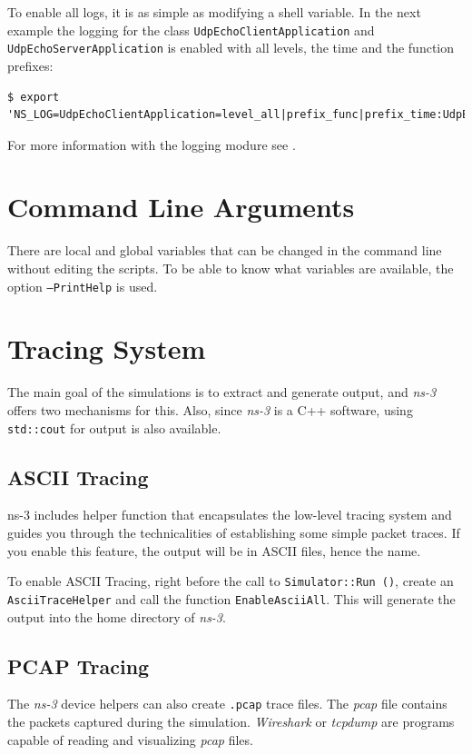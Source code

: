 To enable all logs, it is as simple as modifying a shell variable. In the next example the logging for the class
\texttt{UdpEchoClientApplication} and \texttt{UdpEchoServerApplication} is enabled with all levels, the time 
and the function prefixes:

\begin{lstlisting}[escapechar=@, language=myshell,caption={Enabling logging in ns-3}, captionpos=b]
  $ export 'NS_LOG=UdpEchoClientApplication=level_all|prefix_func|prefix_time:UdpEchoServerApplication=level_all|prefix_func|prefix_time'
\end{lstlisting}

For more information with the logging modure see \cite{ns3}.

\section{Command Line Arguments}
There are local and global variables that can be changed in the command line without
editing the scripts. To be able to know what variables are available, the option \texttt{--PrintHelp} is used.


\section{Tracing System}
The main goal of the simulations is to extract and generate output, and \textit{ns-3} offers two
mechanisms for this. Also, since \textit{ns-3} is a C++ software, using \texttt{std::cout} for
output is also available.

\subsection{ASCII Tracing}
ns-3 includes helper function that encapsulates the low-level tracing system and guides you 
through the technicalities of establishing some simple packet traces. If you enable this feature, 
the output will be in ASCII files, hence the name.

To enable ASCII Tracing, right before the call to \texttt{Simulator::Run ()}, create an \texttt{AsciiTraceHelper}
and call the function \texttt{EnableAsciiAll}.
This will generate the output into the home directory of \textit{ns-3}.

\subsection{PCAP Tracing}
The \textit{ns-3} device helpers can also create \texttt{.pcap} trace files. The \textit{pcap} file
contains the packets captured during the simulation. \textit{Wireshark} or \textit{tcpdump} 
are programs capable of reading and visualizing \textit{pcap} files.

